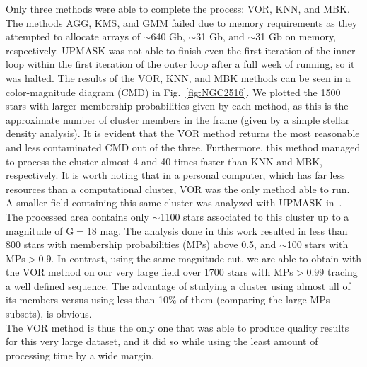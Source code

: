 \documentclass{aa}
\begin{document}
 Only three methods were able to complete the process: VOR, KNN, and MBK. The
 methods AGG, KMS, and GMM failed due to memory requirements as they
 attempted to allocate arrays of $\sim$640 Gb, $\sim$31 Gb, and
 $\sim$31 Gb on memory, respectively. UPMASK was not able to finish even the
 first iteration of the inner loop within the first iteration of the outer loop
 after a full week of running, so it was halted.
 The results of the VOR, KNN, and MBK methods can be seen in a color-magnitude
 diagram (CMD) in Fig.~\ref{fig:NGC2516}. We plotted the 1500 stars with larger
 membership probabilities given by each method, as this is the approximate
 number of cluster members in the frame (given by a simple stellar density
 analysis). It is evident that the VOR method returns the most reasonable and
 less contaminated CMD out of the three. Furthermore, this method managed to
 process the cluster almost 4 and 40 times faster than KNN and MBK,
 respectively. It is worth noting that in a personal computer, which has far
 less resources than a computational cluster, VOR was the only method able to
 run.\\

 A smaller field containing this same cluster was analyzed with UPMASK
 in~\cite{Cantat_2018}. The processed area contains only
 $\sim$1100 stars associated to this cluster up to a magnitude of G${=}18$ mag.
 The analysis done in this work resulted in less than 800 stars
 with membership probabilities (MPs) above 0.5, and $\sim$100 stars with
 MPs$>0.9$. In contrast, using the same magnitude cut, we are able to obtain
 with the VOR method on our very large field over 1700 stars with MPs$>0.99$
 tracing a well defined sequence. The advantage of studying a cluster
 using almost all of its members versus using less than 10\% of them 
 (comparing the large MPs subsets), is obvious.\\

 The VOR method is thus the only one that was able to produce quality results
 for this very large dataset, and it did so while using the least amount of
 processing time by a wide margin.


\end{document}
